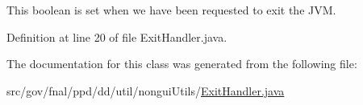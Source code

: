This boolean is set when we have been requested to exit the J\-V\-M. 



Definition at line 20 of file Exit\-Handler.\-java.



The documentation for this class was generated from the following file\-:\begin{DoxyCompactItemize}
\item 
src/gov/fnal/ppd/dd/util/nongui\-Utils/\hyperlink{ExitHandler_8java}{Exit\-Handler.\-java}\end{DoxyCompactItemize}
